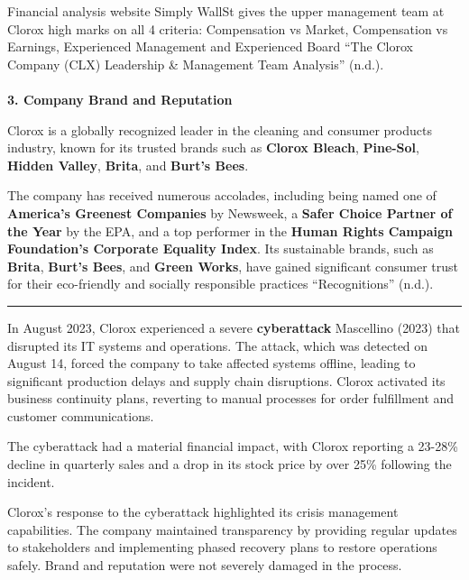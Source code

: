 \documentclass[
  letterpaper,
  DIV=11,
  numbers=noendperiod]{scrartcl}
\makeatletter
\let\oldparagraph\paragraph
\renewcommand{\paragraph}{
    \@ifstar
      \xxxParagraphStar
      \xxxParagraphNoStar
  }
\newcommand{\xxxParagraphStar}[1]{\oldparagraph*{#1}\mbox{}}
\newcommand{\xxxParagraphNoStar}[1]{\oldparagraph{#1}\mbox{}}
\makeatother
\begin{document}
Financial analysis website Simply WallSt gives the upper management team
at Clorox high marks on all 4 criteria: Compensation vs Market,
Compensation vs Earnings, Experienced Management and Experienced Board
{``The {Clorox Company} ({CLX}) {Leadership} \& {Management Team
Analysis}''} (n.d.).

\paragraph{\texorpdfstring{\textbf{3. Company Brand and
Reputation}}{3. Company Brand and Reputation}}\label{company-brand-and-reputation}

Clorox is a globally recognized leader in the cleaning and consumer
products industry, known for its trusted brands such as \textbf{Clorox
Bleach}, \textbf{Pine-Sol}, \textbf{Hidden Valley}, \textbf{Brita}, and
\textbf{Burt's Bees}.

The company has received numerous accolades, including being named one
of \textbf{America's Greenest Companies} by Newsweek, a \textbf{Safer
Choice Partner of the Year} by the EPA, and a top performer in the
\textbf{Human Rights Campaign Foundation's Corporate Equality Index}.
Its sustainable brands, such as \textbf{Brita}, \textbf{Burt's Bees},
and \textbf{Green Works}, have gained significant consumer trust for
their eco-friendly and socially responsible practices {``Recognitions''}
(n.d.).

\begin{center}\rule{0.5\linewidth}{0.5pt}\end{center}

In August 2023, Clorox experienced a severe \textbf{cyberattack}
Mascellino (2023) that disrupted its IT systems and operations. The
attack, which was detected on August 14, forced the company to take
affected systems offline, leading to significant production delays and
supply chain disruptions. Clorox activated its business continuity
plans, reverting to manual processes for order fulfillment and customer
communications.

The cyberattack had a material financial impact, with Clorox reporting a
23-28\% decline in quarterly sales and a drop in its stock price by over
25\% following the incident.

Clorox's response to the cyberattack highlighted its crisis management
capabilities. The company maintained transparency by providing regular
updates to stakeholders and implementing phased recovery plans to
restore operations safely. Brand and reputation were not severely
damaged in the process.
\end{document}
